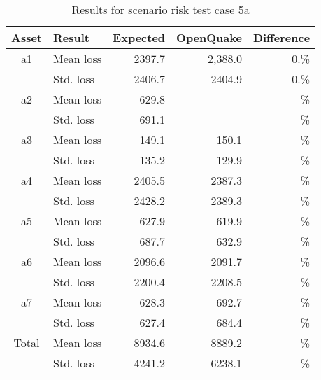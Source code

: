 \begin{table}[htbp]

\centering
\begin{tabular}{ c l r r r }

\hline
\rowcolor{anti-flashwhite}
\bf{Asset} & \bf{Result} & \bf{Expected} & \bf{OpenQuake} & \bf{Difference}\\
\hline
a1 & Mean loss & 2397.7 & 2,388.0 & 0.\% \\
 & Std. loss & 2406.7 & 2404.9 & 0.\% \\
\hline
a2 & Mean loss & 629.8 &  & \% \\
 & Std. loss & 691.1 &  & \% \\
\hline
a3 & Mean loss & 149.1 & 150.1 & \% \\
 & Std. loss & 135.2 & 129.9 & \% \\
\hline
a4 & Mean loss & 2405.5 & 2387.3 & \% \\
 & Std. loss & 2428.2 & 2389.3 & \% \\
\hline
a5 & Mean loss & 627.9 & 619.9 & \% \\
 & Std. loss & 687.7 & 632.9 & \% \\
\hline
a6 & Mean loss & 2096.6 & 2091.7 & \% \\
 & Std. loss & 2200.4 & 2208.5 & \% \\
\hline
a7 & Mean loss & 628.3 & 692.7 & \% \\
 & Std. loss & 627.4 & 684.4 & \% \\
\hline
Total & Mean loss & 8934.6 & 8889.2 & \% \\
 & Std. loss & 4241.2 & 6238.1 & \% \\
\hline
\end{tabular}

\caption{Results for scenario risk test case 5a}
\label{tab:result-scenario-risk-5a}
\end{table}
